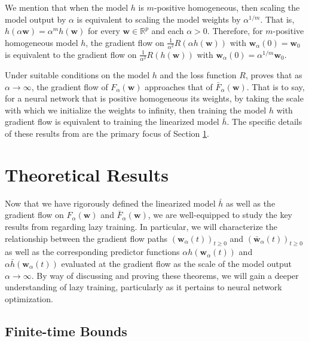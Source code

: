 \documentclass{article}
\begin{document}
We mention that when the model $h$ is $m$-positive homogeneous, then scaling the model output by $\alpha$ is equivalent to scaling the model weights by $\alpha^{1/m}$. That is, $h(\alpha \boldsymbol{w}) = \alpha^m h(\boldsymbol{w})$ for every $\boldsymbol{w} \in \mathbb{R}^p$ and each $\alpha > 0$. Therefore, for $m$-positive homogeneous model $h$, the gradient flow on $\frac{1}{\alpha^2}R(\alpha h(\boldsymbol{w}))$ with $\boldsymbol{w}_{\alpha}(0) = \boldsymbol{w}_0$ is equivalent to the gradient flow on $\frac{1}{\alpha^2}R(h(\boldsymbol{w}))$ with $\boldsymbol{w}_{\alpha}(0) = \alpha^{1/m}\boldsymbol{w}_0$.

Under suitable conditions on the model $h$ and the loss function $R$, \cite{chizat2018lazy} proves that as $\alpha \rightarrow \infty$, the gradient flow of $F_{\alpha}(\boldsymbol{w})$ approaches that of $\bar{F}_{\alpha}(\boldsymbol{w})$. That is to say, for a neural network that is positive homogeneous its weights, by taking the scale with which we initialize the weights to infinity, then training the model  $h$ with gradient flow is equivalent to training the linearized model $\bar{h}$. The specific details of these results from \cite{chizat2018lazy} are the primary focus of Section \ref{theory}.

\section{Theoretical Results}\label{theory}

Now that we have rigorously defined the linearized model $\bar{h}$ as well as the gradient flow on $F_{\alpha}(\boldsymbol{w})$ and $\bar{F}_{\alpha}(\boldsymbol{w})$, we are well-equipped to study the key results from \cite{chizat2018lazy} regarding lazy training. In particular, we will characterize the relationship between the gradient flow paths $(\boldsymbol{w}_{\alpha}(t))_{t \geq 0}$ and $(\boldsymbol{\bar{w}}_{\alpha}(t))_{t \geq 0}$ as well as the corresponding predictor functions $\alpha h(\boldsymbol{w}_{\alpha}(t))$ and $\alpha \bar{h}(\boldsymbol{w}_{\alpha}(t))$ evaluated at the gradient flow as the scale of the model output $\alpha \rightarrow \infty$. By way of discussing and proving these theorems, we will gain a deeper understanding of lazy training, particularly as it pertains to neural network optimization.

\subsection{Finite-time Bounds}
\end{document}
